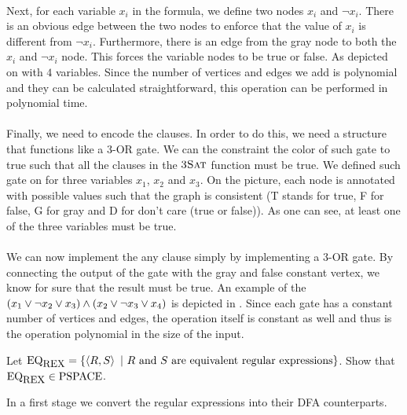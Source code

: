 \documentclass{article}
\begin{document}
\begin{exercise}
\begin{answer}
\paragraph{}
Next, for each variable $x_i$ in the  formula, we define two nodes $x_i$ and $\neg x_i$. There is an obvious edge between the two nodes to enforce that the value of $x_i$ is different from $\neg x_i$. Furthermore, there is an edge from the gray node to both the $x_i$ and $\neg x_i$ node. This forces the variable nodes to be true or false. As depicted on  with $4$ variables. Since the number of vertices and edges we add is polynomial and they can be calculated straightforward, this operation can be performed in polynomial time.
\paragraph{}
Finally, we need to encode the clauses. In order to do this, we need a structure that functions like a 3-OR gate. We can the constraint the color of such gate to true such that all the clauses in the $\mbox{\textsc{3Sat}}$ function must be true. We defined such gate on  for three variables $x_1$, $x_2$ and $x_3$. On the picture, each node is annotated with possible values such that the graph is consistent (T stands for true, F for false, G for gray and D for don't care (true or false)). As one can see, at least one of the three variables must be true.
\paragraph{}
We can now implement the any clause simply by implementing a 3-OR gate. By connecting the output of the gate with the gray and false constant vertex, we know for sure that the result must be true. An example of the $\left( x_1\vee\neg x_2\vee x_3 \right)\wedge\left( x_2\vee\neg x_3\vee x_4 \right)$ is depicted in . Since each gate has a constant number of vertices and edges, the operation itself is constant as well and thus is the operation polynomial in the size of the input.
\end{answer}
\end{exercise}
\begin{exercise}
Let $\mbox{EQ}_{\mbox{\small{REX}}}=\left\{ \left\langle R,S \right\rangle\ |\ \mbox{$R$ and $S$ are equivalent regular expressions} \right\}$. Show that $\mbox{EQ}_{\mbox{\small{REX}}}\in\mbox{PSPACE}$.
\begin{answer}
In a first stage we convert the regular expressions into their DFA counterparts. 
\end{answer}
\end{exercise}
\end{document}
